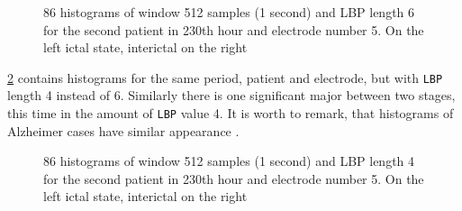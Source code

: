 \begin{figure}[H]
	\begin{center}
	\end{center}
	\caption{86 histograms of window 512 samples (1 second) and LBP length 6 for the second patient in 230th hour and electrode number 5. On the left ictal state, interictal on the right}

	\label{fig:histograms_1}
\end{figure}
\figurename{} \ref{fig:histograms_2} contains histograms for the same period, patient and electrode, but with \verb|LBP| length 4 instead of 6. Similarly there is one significant major between two stages, this time in the amount of \verb|LBP| value 4. It is worth to remark, that histograms of Alzheimer cases have similar appearance \cite{alzheimer}. 
\begin{figure}[H]
	\begin{center}
	\end{center}
	\caption{86 histograms of window 512 samples (1 second) and LBP length 4 for the second patient in 230th hour and electrode number 5. On the left ictal state, interictal on the right}

	\label{fig:histograms_2}
\end{figure}
